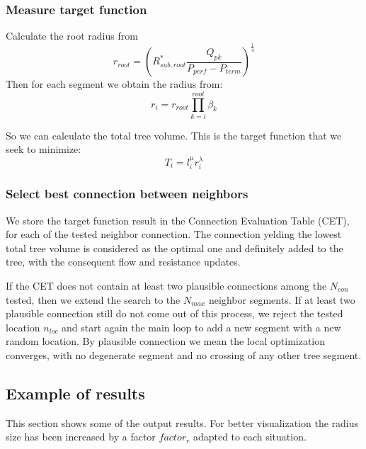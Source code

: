\documentclass[a4paper, 11pt]{article} %
\begin{document}
\subsubsection{Measure target function}
\label{target}
Calculate the root radius from
\begin{equation}
r_{root} = \left( R_{sub, root}^* \frac{Q_{pk}}{P_{perf}-P_{term}}\right)^\frac{1}{4}
\end{equation}
Then for each segment we obtain the radius from:
\begin{equation}
r_i = r_{root} \prod\limits_{k=i}^{root} \beta_k
\end{equation}

So we can calculate the total tree volume. This is the target function that we seek to minimize:
\begin{equation}
T_i = l_i^{\mu} r_i^{\lambda}
\end{equation}

 

\subsubsection{Select best connection between neighbors}
We store the target function result in the Connection Evaluation Table (CET), for each of the tested neighbor connection. The connection yelding the lowest total tree volume is considered as the optimal one and definitely added to the tree, with the consequent flow and resistance updates.

If the CET does not contain at least two plausible connections among the $N_{con}$ tested, then we extend the search to the $N_{max}$ neighbor segments. If at least two plausible connection still do not come out of this process, we reject the tested location $n_{loc}$ and start again the main loop to add a new segment with a new random location.
By plausible connection we mean the local optimization converges, with no degenerate segment and no crossing of any other tree segment. 


\subsection{Example of results}
This section shows some of the output results. For better visualization the radius size has been increased by a factor $factor_r$ adapted to each situation.
\end{document}
